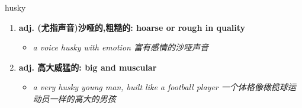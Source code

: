 
\begin{frame}
{\huge husky}
\begin{center}
\begin{enumerate}\Large
  \item \textbf{adj. (尤指声音)沙哑的,粗糙的: hoarse or rough in quality}
  \begin{itemize}
    \item \em{\Large{a voice husky with emotion 富有感情的沙哑声音}}
  \end{itemize}
  \item \textbf{adj. 高大威猛的: big and muscular}
  \begin{itemize}
    \item \em{\Large{a very husky young man, built like a football player 一个体格像橄榄球运动员一样的高大的男孩}}
  \end{itemize}
\end{enumerate}
\end{center}
\end{frame}
